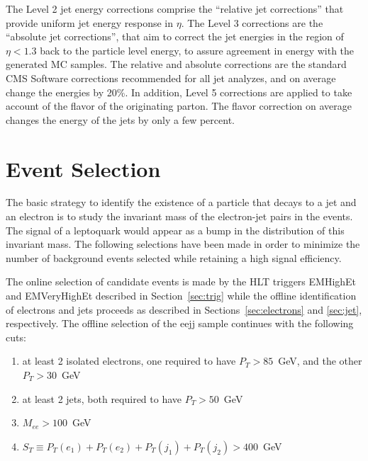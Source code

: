 \documentclass{cmspaper}
\begin{document}
\begin{linenumbers}
The Level 2 jet energy corrections comprise the 
``relative jet corrections'' that provide uniform jet energy response in $\eta$.  
The Level 3 corrections are the ``absolute jet corrections'', that aim to correct  the jet energies in the 
region of $\eta < 1.3$ back to the particle level energy, to assure agreement in energy with the generated MC samples. 
The relative and absolute corrections are the standard CMS Software corrections recommended for all jet analyzes,
and on average change the energies by 20\%.
In addition, Level 5 corrections are applied to take account of the flavor of the originating parton.
The flavor correction on average changes the energy of the jets by only a few percent.

\section{Event Selection} \label{sec:eventSelection}
The basic strategy to identify the existence of a particle that decays to a jet and an electron 
is to study the invariant mass of the electron-jet pairs in the events. 
The signal of a leptoquark would appear as a bump in the distribution of this invariant mass.
The following selections have been made in order to minimize the number of background events 
selected while retaining a high signal efficiency.

The online selection of candidate events is made by the HLT triggers EMHighEt and EMVeryHighEt 
described in Section~\ref{sec:trig} while the offline identification of electrons and jets 
proceeds as described in Sections~\ref{sec:electrons} and \ref{sec:jet}, respectively.
The offline selection of the eejj sample continues with the following cuts:

\begin{enumerate}
\item at least 2 isolated electrons, one required to have $P_T>85$~GeV, 
and the other $P_T>30$~GeV 
\item at least 2 jets, both required to have $P_T>50$~GeV
\item $M_{ee}>100$~GeV
\item $S_T\equiv P_T(e_1)+P_T(e_2)+P_T(j_1)+P_T(j_2)>400$~GeV
\end{enumerate}


\end{linenumbers}
\end{document}
